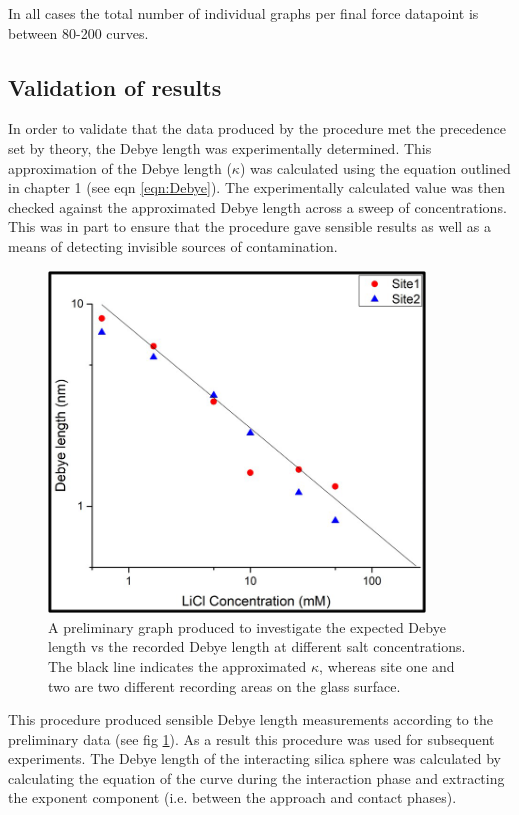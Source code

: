 In all cases the total number of individual graphs per final force datapoint is between 80-200 curves.

\subsection{Validation of results}

In order to validate that the data produced by the procedure met the precedence set by theory, the Debye length was experimentally determined. This approximation of the Debye length ($\kappa$) was calculated using the equation outlined in chapter 1 (see eqn \ref{eqn:Debye}). The experimentally calculated value was then checked against the approximated Debye length across a sweep of concentrations. This was in part to ensure that the procedure gave sensible results as well as a means of detecting invisible sources of contamination.

\begin{figure}[h!!]    
        \begin{center}
          \includegraphics[width=100mm]{chapter4/DebyeLength.png}
\end{center}
\caption{A preliminary graph produced to investigate the expected Debye length vs the recorded Debye length at different salt concentrations. The black line indicates the approximated $\kappa$, whereas site one and two are two different recording areas on the glass surface.}
\label{fig:DebyeLength}                 
\end{figure}

This procedure produced sensible Debye length measurements according to the preliminary data (see fig \ref{fig:DebyeLength}). As a result this procedure was used for subsequent experiments. The Debye length of the interacting silica sphere was calculated by calculating the equation of the curve during the interaction phase and extracting the exponent component (i.e. between the approach and contact phases).

